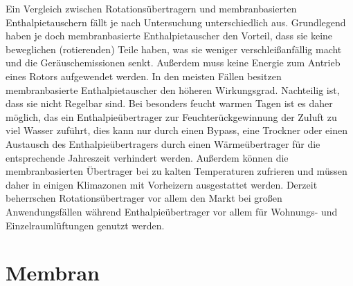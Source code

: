 \documentclass[ 11pt
				,ngerman
				,headsepline
				,headings=small
				,numbers=noenddot %
				,draft=false
				,BCOR=0mm %
				,DIV=12
				,captions=tableheading
				,paper=a4
				,abstracton
                ]{scrreprt}
\begin{document}
\begin{normalsize}
\begin{LARGE}

Ein Vergleich zwischen Rotationsübertragern und membranbasierten Enthalpietauschern fällt je nach Untersuchung unterschiedlich aus. Grundlegend haben je doch membranbasierte Enthalpietauscher den Vorteil, dass sie keine beweglichen (rotierenden) Teile haben, was sie weniger verschleißanfällig macht und die Geräuschemissionen senkt. Außerdem muss keine Energie zum Antrieb eines Rotors aufgewendet werden. In den meisten Fällen besitzen membranbasierte Enthalpietauscher den höheren Wirkungsgrad. Nachteilig ist, dass sie nicht Regelbar sind. Bei besonders feucht warmen Tagen ist es daher möglich, das ein Enthalpieübertrager zur Feuchterückgewinnung der Zuluft zu viel Wasser zuführt, dies kann nur durch einen Bypass, eine Trockner oder einen Austausch des Enthalpieübertragers durch einen Wärmeübertrager für die entsprechende Jahreszeit verhindert werden. Außerdem können die membranbasierten Übertrager bei zu kalten Temperaturen zufrieren und müssen daher in einigen Klimazonen mit Vorheizern ausgestattet werden. Derzeit beherrschen Rotationsübertrager vor allem den Markt bei großen Anwendungsfällen während Enthalpieübertrager vor allem für Wohnungs- und Einzelraumlüftungen genutzt werden.  


\section{Membran}


\end{LARGE}
\end{normalsize}
\end{document}
